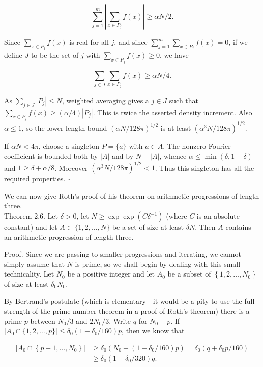 \documentclass[10pt]{article}
\begin{document}
$$
\sum_{j=1}^{m}\left|\sum_{x \in P_{j}} f(x)\right| \geqslant \alpha N / 2 .
$$

Since $\sum_{x \in P_{j}} f(x)$ is real for all $j$, and since $\sum_{j=1}^{m} \sum_{x \in P_{j}} f(x)=0$, if we define $J$ to be the set of $j$ with $\sum_{x \in P_{j}} f(x) \geqslant 0$, we have

$$
\sum_{j \in J} \sum_{x \in P_{j}} f(x) \geqslant \alpha N / 4 .
$$

As $\sum_{j\in J}|P_j|\leqslant N$, weighted averaging gives a $j\in J$ such that $\sum_{x\in P_j}f(x)\geqslant(\alpha/4)|P_j|$.  This is twice the asserted density increment.  Also $\alpha\leqslant1$, so the lower length bound $(\alpha N/128\pi)^{1/2}$ is at least $(\alpha^3N/128\pi)^{1/2}$.

If $\alpha N<4\pi$, choose a singleton $P=\{a\}$ with $a\in A$.  The nonzero Fourier coefficient is bounded both by $|A|$ and by $N-|A|$, whence $\alpha\leqslant\min(\delta,1-\delta)$ and $1\geqslant\delta+\alpha/8$.  Moreover $(\alpha^3N/128\pi)^{1/2}<1$.  Thus this singleton has all the required properties. \(\square\)

We can now give Roth's proof of his theorem on arithmetic progressions of length three.\\
Theorem 2.6. Let $\delta>0$, let $N \geqslant \exp \exp \left(C \delta^{-1}\right)$ (where $C$ is an absolute constant) and let $A \subset\{1,2, \ldots, N\}$ be a set of size at least $\delta N$. Then $A$ contains an arithmetic progression of length three.

Proof. Since we are passing to smaller progressions and iterating, we cannot simply assume that $N$ is prime, so we shall begin by dealing with this small technicality. Let $N_{0}$ be a positive integer and let $A_{0}$ be a subset of $\left\{1,2, \ldots, N_{0}\right\}$ of size at least $\delta_{0} N_{0}$.

By Bertrand's postulate (which is elementary - it would be a pity to use the full strength of the prime number theorem in a proof of Roth's theorem) there is a prime $p$ between $N_{0} / 3$ and $2 N_{0} / 3$. Write $q$ for $N_{0}-p$. If $\left|A_{0} \cap\{1,2, \ldots, p\}\right| \leqslant \delta_{0}\left(1-\delta_{0} / 160\right) p$, then we know that

$$
\begin{aligned}
\left|A_{0} \cap\left\{p+1, \ldots, N_{0}\right\}\right| & \geqslant \delta_{0}\left(N_{0}-\left(1-\delta_{0} / 160\right) p\right)=\delta_{0}\left(q+\delta_{0} p / 160\right) \\
& \geqslant \delta_{0}\left(1+\delta_{0} / 320\right) q .
\end{aligned}
$$
\end{document}
